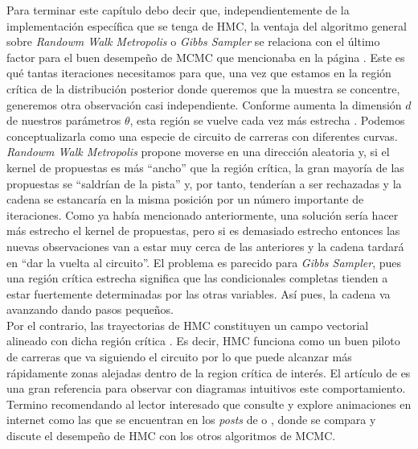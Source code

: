 Para terminar este capítulo debo decir que, independientemente de la implementación específica que se tenga de HMC, la ventaja del algoritmo general sobre \textit{Randowm Walk Metropolis} o \textit{Gibbs Sampler} se relaciona con el último factor para el buen desempeño de MCMC que mencionaba en la página \pageref{factor_ventaja_HMC}. Este es qué tantas iteraciones necesitamos para que, una vez que estamos en la región crítica de la distribución posterior donde queremos que la muestra se concentre, generemos otra observación casi independiente. Conforme aumenta la dimensión $d$ de nuestros parámetros $\theta$, esta región se vuelve cada vez más estrecha \parencites{Betancourt17,McElreath17}. Podemos conceptualizarla como una especie de circuito de carreras con diferentes curvas.\\ 

\textit{Randowm Walk Metropolis} propone moverse en una dirección aleatoria y, si el kernel de propuestas es más ``ancho'' que la región crítica, la gran mayoría de las propuestas se ``saldrían de la pista'' y, por tanto, tenderían a ser rechazadas y la cadena se estancaría en la misma posición por un número importante de iteraciones. Como ya había mencionado anteriormente, una solución sería hacer más estrecho el kernel de propuestas, pero si es demasiado estrecho entonces las nuevas observaciones van a estar muy cerca de las anteriores y la cadena tardará en ``dar la vuelta al circuito''. El problema es parecido para \textit{Gibbs Sampler}, pues una región crítica estrecha significa que las condicionales completas tienden a estar fuertemente determinadas por las otras variables. Así pues, la cadena va avanzando dando pasos pequeños.\\ 

Por el contrario, las trayectorias de HMC constituyen un campo vectorial alineado con dicha región crítica \parencite{Betancourt17}. Es decir, HMC funciona como un buen piloto de carreras que va siguiendo el circuito por lo que puede alcanzar más rápidamente zonas alejadas dentro de la region crítica de interés. El artículo de \textcite{Betancourt17} es una gran referencia para observar con diagramas intuitivos este comportamiento. Termino recomendando al lector interesado que consulte y explore animaciones en internet como las que se encuentran en los \textit{posts} de \textcite{McElreath17} o \textcite{Rogozhnikov16}, donde se compara y discute el desempeño de HMC con los otros algoritmos de MCMC. 
